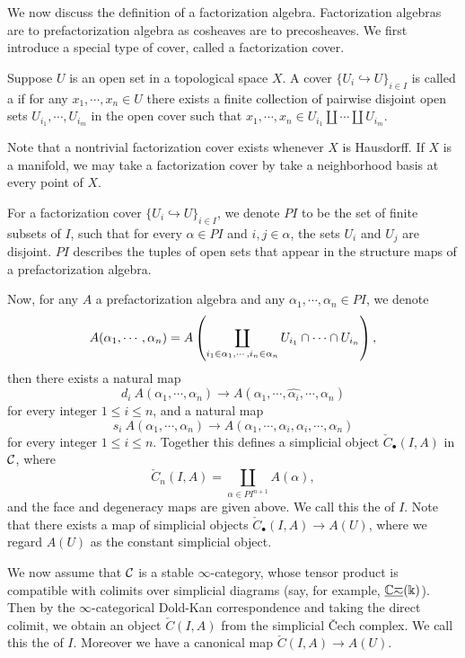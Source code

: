\documentclass[twoside]{article}
\begin{document}
We now discuss the definition of a factorization algebra. 
Factorization algebras are to prefactorization algebra as cosheaves
are to precosheaves. We first introduce a special type of cover, called a 
factorization cover.

\begin{definition}
    Suppose $U$ is an open set in a topological space $X$. A cover 
    $\{U_i\hookrightarrow U\}_{i\in I}$ is called a 
    if for any $x_1,\cdots,x_n\in U$ there exists a finite collection of pairwise
    disjoint open sets $U_{i_1},\cdots,U_{i_m}$ in the open cover such that
    $x_1,\cdots,x_n\in U_{i_1}\coprod\cdots\coprod U_{i_m}$. 
\end{definition}

\begin{remark}
    Note that a nontrivial factorization cover exists whenever $X$ is Hausdorff.
    If $X$ is a manifold, we may take a factorization cover by take a neighborhood
    basis at every point of $X$.
\end{remark}

For a factorization cover $\{U_i\hookrightarrow U\}_{i\in I}$, we denote 
$PI$ to be the set of finite subsets of $I$, such that for every $\alpha\in PI$
and $i,j\in\alpha$, the sets $U_i$ and $U_j$ are disjoint. $PI$ describes
the tuples of open sets that appear in the structure maps of a 
prefactorization algebra. 

Now, for any $A$ a prefactorization algebra and any $\alpha_1,\cdots,\alpha_n
\in PI$, we denote \[A(\alpha_1,\cdots,\alpha_n)
=A\left(\coprod_{i_1\in\alpha_1,\cdots,i_n\in\alpha_n}
U_{i_1}\cap\cdots\cap U_{i_n}\right),\] then there exists a natural map
\[d_i\:A(\alpha_1,\cdots,\alpha_n)\to A(\alpha_1,\cdots,\widehat{\alpha_i},
\cdots,\alpha_n)\] for every integer $1\le i\le n$, and a natural map
\[s_i\:A(\alpha_1,\cdots,\alpha_n)\to A(\alpha_1,\cdots,\alpha_i,\alpha_i,
\cdots,\alpha_n)\] for every integer $1\le i\le n$. Together this defines
a simplicial object $\check{C}_\bullet(I,A)$ in $\cal C$, where
\[\check{C}_n(I,A)=\coprod_{\alpha\in PI^{n+1}}A(\alpha),\] and the face and
degeneracy maps are given above. We call this the  of $I$. Note that there exists a map of simplicial objects
$\check{C}_\bullet(I,A)\to A(U)$, where we regard $A(U)$ as the
constant simplicial object.

We now assume that $\cal C$ is a stable $\infty$-category, whose tensor product
is compatible with colimits over simplicial diagrams (say, for example,
$\underline{\mathbb{Ch}}(\Bbbk)$). Then by the $\infty$-categorical Dold-Kan correspondence 
and taking the direct colimit, we obtain an object $\check{C}(I,A)$
from the simplicial \v{C}ech complex. We call this the 
of $I$. Moreover we have a canonical map $\check{C}(I,A)\to A(U)$.
\end{document}

